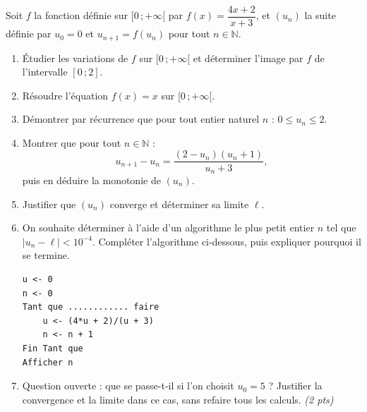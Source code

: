 \documentclass[11pt]{article}
\begin{document}
\begin{exercice}[Étude complète d'une suite définie par $u_{n+1} = f(u_n)$]
Soit $f$ la fonction définie sur $[0\,; +\infty[$ par $f(x) = \dfrac{4x + 2}{x + 3}$, et $(u_n)$ la suite définie par $u_0 = 0$ et $u_{n+1} = f(u_n)$ pour tout $n \in \mathbb{N}$.
\begin{enumerate}
\item Étudier les variations de $f$ sur $[0\,; +\infty[$ et déterminer l'image par $f$ de l'intervalle $[0\,; 2]$.
\item Résoudre l'équation $f(x) = x$ sur $[0\,; +\infty[$.
\item Démontrer par récurrence que pour tout entier naturel $n$ : $0 \leq u_n \leq 2$.
\item Montrer que pour tout $n \in \mathbb{N}$ :
\[ u_{n+1} - u_n = \frac{(2 - u_n)(u_n + 1)}{u_n + 3}, \]
puis en déduire la monotonie de $(u_n)$.
\item Justifier que $(u_n)$ converge et déterminer sa limite $\ell$.
\item On souhaite déterminer à l'aide d'un algorithme le plus petit entier $n$ tel que $|u_n - \ell| < 10^{-4}$. Compléter l'algorithme ci-dessous, puis expliquer pourquoi il se termine.
\begin{verbatim}
u <- 0
n <- 0
Tant que ............ faire
    u <- (4*u + 2)/(u + 3)
    n <- n + 1
Fin Tant que
Afficher n
\end{verbatim}
\item Question ouverte : que se passe-t-il si l'on choisit $u_0 = 5$ ? Justifier la convergence et la limite dans ce cas, sans refaire tous les calculs. \emph{(2 pts)}
\end{enumerate}
\end{exercice}
\end{document}
